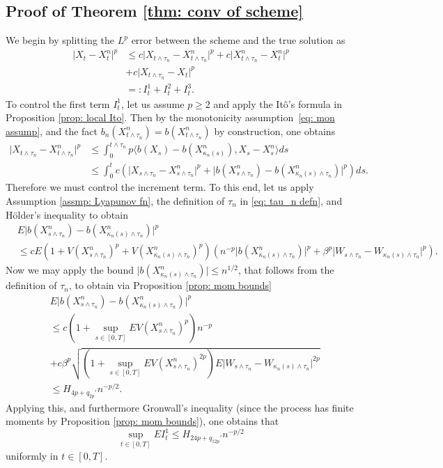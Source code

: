 \documentclass{article}
\begin{document}
\subsection{Proof of Theorem \ref{thm: conv of scheme}}
We begin by splitting the $L^p$ error between the scheme and the true solution as
    \begin{align}\label{eq: final splitting}
\lvert X_t-X^n_t\rvert^p&\leq c\lvert X_{t\wedge \tau_n}-X^n_{t\wedge \tau_n}\rvert^p+c\lvert X^n_{t\wedge \tau_n}-X^n_t\rvert^p\nonumber \\
&+c\lvert X_{t\wedge \tau_n}-X_t\rvert^p\nonumber \\
&=:I^1_t+I^2_t+I^3_t.
    \end{align}
To control the first term $I^1_t$, let us assume $p\geq 2$ and apply the Itô's formula in Proposition \ref{prop: local Ito}. Then by the monotonicity assumption~\eqref{eq: mon assump}, and the fact $b_n(X^n_{t\wedge \tau_n})=b(X^n_{t\wedge \tau_n})$ by construction, one obtains
 \begin{align}
\lvert X_{t\wedge \tau_n}-X^n_{t\wedge \tau_n}\rvert^p&\leq \int^{t\wedge \tau_n}_0 p\langle b(X_s)-b(X^n_{\kappa_n(s)}),X_s-X^n_s\rangle ds\nonumber \\
&\leq \int^t_0 c( \lvert X_{s\wedge \tau_n}-X^n_{s\wedge \tau_n} \rvert^p+\lvert b(X^n_{s\wedge \tau_n})-b(X^n_{\kappa_n(s)\wedge \tau_n})\rvert^p) ds.
    \end{align}
Therefore we must control the increment term. To this end, let us apply Assumption \ref{assmp: Lyapunov fn}, the definition of $\tau_n$ in \eqref{eq: tau_n defn}, and Hölder's inequality to obtain
     \begin{align}
       &E\lvert b(X^n_{s\wedge \tau_n})-b(X^n_{\kappa_n(s)\wedge \tau_n})\rvert^p  \nonumber\\
       &\leq cE(1+V(X^n_{s\wedge \tau_n})^p+V(X^n_{\kappa_n(s)\wedge \tau_n})^p)(n^{-p}\lvert b(X^n_{\kappa_n(s)\wedge \tau_n})\rvert^p+\beta^p\lvert W_{s\wedge \tau_n}-W_{\kappa_n(s)\wedge \tau_n} \rvert^p).
    \end{align}
    Now we may apply the bound $\lvert b(X^n_{\kappa_n(s)\wedge \tau_n})\rvert\leq n^{1/2}$, that follows from the definition of $\tau_n$, to obtain via Proposition \ref{prop: mom bounds}
         \begin{align}\label{eq: inc bound}
       &E\lvert b(X^n_{s\wedge \tau_n})-b(X^n_{\kappa_n(s)\wedge \tau_n})\rvert^p  \nonumber\\
       &\leq c(1+\sup_{s\in [0,T]}EV(X^n_{s\wedge \tau_n})^p)n^{-p}\nonumber \\
       &+c\beta^p\sqrt{(1+\sup_{s\in [0,T]}EV(X^n_{s\wedge \tau_n})^{2p})E\lvert W_{s\wedge \tau_n}-W_{\kappa_n(s)\wedge \tau_n} \rvert^{2p}}\nonumber \\
       &\leq H_{4p+q_{2p}'}n^{-p/2}.
    \end{align}
    Applying this, and furthermore Gronwall's inequality (since the process has finite moments by Proposition \ref{prop: mom bounds}), one obtains that 
    \begin{equation}
    \sup_{t\in [0,T]}EI^1_t\leq H_{24p+q_{12p}'}n^{-p/2}
    \end{equation}
    uniformly in $t\in [0,T]$. 
    
\end{document}
